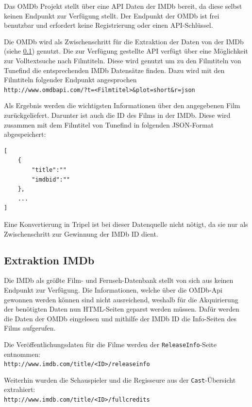 \documentclass[parskip]{scrartcl}
\begin{document}
Das OMDb Projekt stellt über eine API Daten der IMDb bereit, da diese selbst keinen Endpunkt zur Verfügung stellt. Der Endpunkt der OMDb ist frei benutzbar und erfordert keine Registrierung oder einen API-Schlüssel.

Die OMDb wird als Zwischenschritt für die Extraktion der Daten von der IMDb (siehe \ref{subsec:imdb}) genutzt. Die zur Verfügung gestellte API verfügt über eine Möglichkeit zur Volltextsuche nach Filmtiteln. Diese wird genutzt um zu den Filmtiteln von Tunefind die entsprechenden IMDb Datensätze finden. Dazu wird mit den Filmtiteln folgender Endpunkt angesprochen\\
\texttt{http://www.omdbapi.com/?t=<Filmtitel>\&plot=short\&r=json}

Als Ergebnis werden die wichtigsten Informationen über den angegebenen Film zurückgeliefert. Darunter ist auch die ID des Films in der IMDb. Diese wird zusammen mit dem Filmtitel von Tunefind in folgenden JSON-Format abgespeichert:

\begin{lstlisting}[caption={OMDb JSON-Format}, label={list:omdbJson}]
[  
    {  
        "title":""
        "imdbid":""
    },
    ...
]
\end{lstlisting}

Eine Konvertierung in Tripel ist bei dieser Datenquelle nicht nötigt, da sie nur als Zwischenschritt zur Gewinnung der IMDb ID dient.

\subsection{Extraktion IMDb}
\label{subsec:imdb}

Die IMDb als größte Film- und Fernseh-Datenbank stellt von sich aus keinen Endpunkt zur Verfügung. Die Informationen, welche über die OMDb-Api gewonnen werden können sind nicht ausreichend, weshalb für die Akquirierung der benötigten Daten nun HTML-Seiten geparst werden müssen. Dafür werden die Daten der OMDb eingelesen und mithilfe der IMDb ID die Info-Seiten des Films aufgerufen.

Die Veröffentlichungsdaten für die Filme werden der \texttt{ReleaseInfo}-Seite entnommen:\\
\texttt{http://www.imdb.com/title/<ID>/releaseinfo}

Weiterhin wurden die Schauspieler und die Regisseure aus der \texttt{Cast}-Übersicht extrahiert:\\
\texttt{http://www.imdb.com/title/<ID>/fullcredits}
\end{document}
